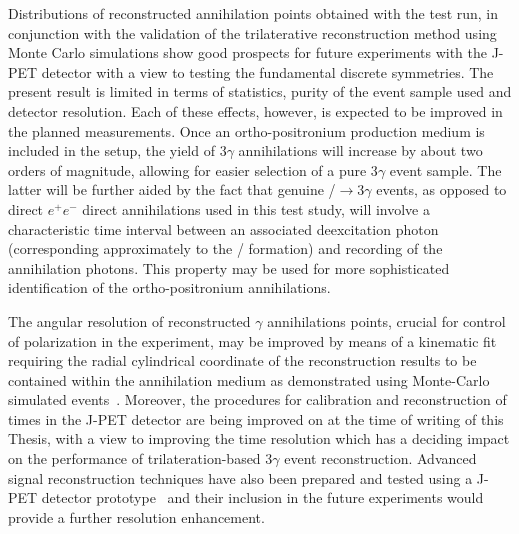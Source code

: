 Distributions of reconstructed annihilation points obtained with the test run, in conjunction with the validation of the trilaterative reconstruction method using Monte Carlo simulations show good prospects for future experiments with the \mbox{J-PET} detector with a view to testing the fundamental discrete symmetries.
The present result is limited in terms of statistics, purity of the event sample used and detector resolution. Each of these effects, however, is expected to be improved in the planned measurements.
Once an ortho-positronium production medium is included in the setup, the yield of 3$\gamma$ annihilations will increase by about two orders of magnitude, allowing for easier selection of a pure 3$\gamma$ event sample. The latter will be further aided by the fact that genuine \ops/$\to 3\gamma$ events, as opposed to direct $e^+e^-$ direct annihilations used in this test study, will involve a characteristic time interval between an associated deexcitation photon (corresponding approximately to the \ops/ formation) and recording of the annihilation photons. This property may be used for more sophisticated identification of the ortho-positronium annihilations.

The angular resolution of reconstructed $\gamma$ annihilations points, crucial for control of polarization in the experiment, may be improved by means of a kinematic fit requiring the radial cylindrical coordinate of the reconstruction results to be contained within the annihilation medium as demonstrated using Monte-Carlo simulated events~\cite{gajos_gps}. Moreover, the procedures for calibration and reconstruction of times in the \mbox{J-PET} detector are being improved on at the time of writing of this Thesis, with a view to improving the time resolution which has a deciding impact on the performance of trilateration-based 3$\gamma$ event reconstruction. Advanced signal reconstruction techniques have also been prepared and tested using a \mbox{J-PET} detector prototype~\cite{lech_compressive, neha_synchronized} and their inclusion in the future experiments would provide a further resolution enhancement.


